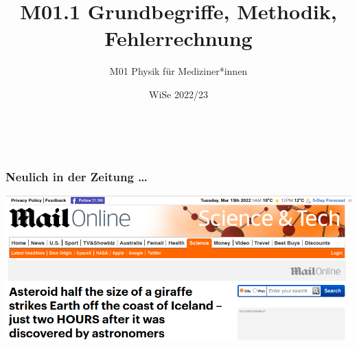 \documentclass{beamer}
\title[M01.1 Grundbegriffe]{M01.1 Grundbegriffe, Methodik, Fehlerrechnung}
\author[melanie.stefan@medicalschool-berlin.de]{M01 Physik für Mediziner*innen}
\institute[]{Prof. Melanie Stefan - melanie.stefan@medicalschool-berlin.de}
\date{WiSe 2022/23}
\begin{document}
 
 
 
{  
\begin{frame}

 \maketitle 

$\,$\\[6cm] 


\end{frame} 
}
 

\begin{frame}
\frametitle{Neulich in der Zeitung \dots}

\begin{center}
\includegraphics[width=\textwidth]{giraffe.png}
\end{center}

 
\end{frame}
\end{document}
